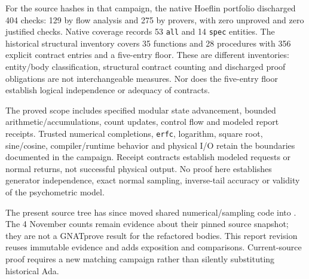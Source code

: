 For the source hashes in that campaign, the native Hoeflin portfolio
discharged 404 checks: 129 by flow analysis and 275 by provers, with zero
unproved and zero justified checks. Native coverage records 53
\texttt{all} and 14 \texttt{spec} entities. The historical structural
inventory covers 35 functions and 28 procedures with 356 explicit
contract entries and a five-entry floor. These are different inventories:
entity/body classification, structural contract counting and discharged
proof obligations are not interchangeable measures. Nor does the
five-entry floor establish logical independence or adequacy of contracts.

The proved scope includes specified modular state advancement, bounded
arithmetic/accumulations, count updates, control flow and modeled report
receipts. Trusted numerical completions, \texttt{erfc}, logarithm,
square root, sine/cosine, compiler/runtime behavior and physical I/O retain
the boundaries documented in the campaign. Receipt contracts establish
modeled requests or normal returns, not successful physical output. No
proof here establishes generator independence, exact normal sampling,
inverse-tail accuracy or validity of the psychometric model.

The present source tree has since moved shared numerical/sampling code
into . The 4 November counts remain evidence about
their pinned source snapshot; they are not a GNATprove result for the
refactored bodies. This report revision reuses immutable evidence and
adds exposition and comparisons. Current-source proof requires a new
matching campaign rather than silently substituting historical Ada.
